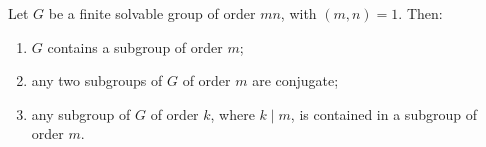 Let $G$ be a finite solvable group of order $mn$, with $(m,n) = 1$. Then:
\begin{enumerate}
\item[(i)] $G$ contains a subgroup of order $m$;
\item[(ii)] any two subgroups of $G$ of order $m$ are conjugate;
\item[(iii)] any subgroup of $G$ of order $k$, where $k \mid m$, is contained in a subgroup of order $m$.
\end{enumerate}
